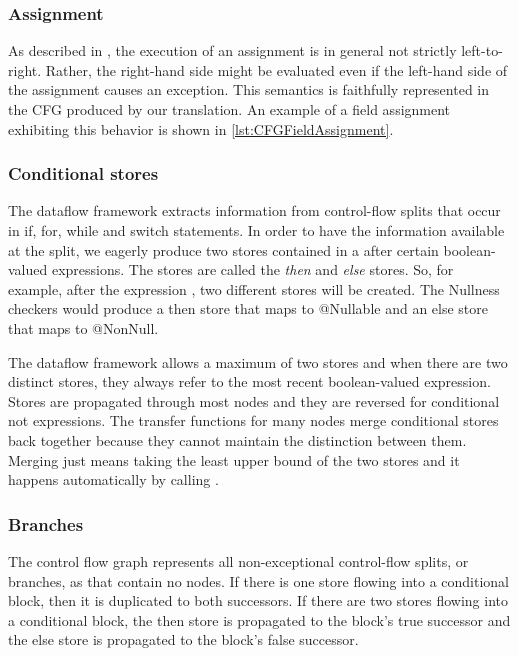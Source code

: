 \subsubsection{Assignment}

As described in , the execution of an assignment is in general
not strictly left-to-right. Rather, the right-hand side might be evaluated even
if the left-hand side of the assignment causes an exception. This semantics is faithfully
represented in the CFG produced by our translation.
An example of a field assignment exhibiting this behavior is shown in \autoref{lst:CFGFieldAssignment}.



\subsubsection{Conditional stores}

The dataflow framework extracts information from control-flow splits that occur in if, for, while and switch statements.  In order to have the information available at the split, we eagerly produce two stores contained in a  after certain boolean-valued expressions.  The stores are called the \emph{then} and \emph{else} stores.  So, for example, after the expression , two different stores will be created.  The Nullness checkers would produce a then store that maps  to @Nullable and an else store that maps  to @NonNull.

The dataflow framework allows a maximum of two stores and when there are two distinct stores, they always refer to the most recent boolean-valued expression.  Stores are propagated through most nodes and they are reversed for conditional not expressions.  The transfer functions for many nodes merge conditional stores back together because they cannot maintain the distinction between them.  Merging just means taking the least upper bound of the two stores and it happens automatically by
calling .


\subsubsection{Branches}

The control flow graph represents all non-exceptional control-flow splits, or branches, as  that contain no nodes.  If there is one store flowing into a conditional block, then it is duplicated to both successors.  If there are two stores flowing into a conditional block, the then store is propagated to the block's true successor and the else store is propagated to the block's false successor.

